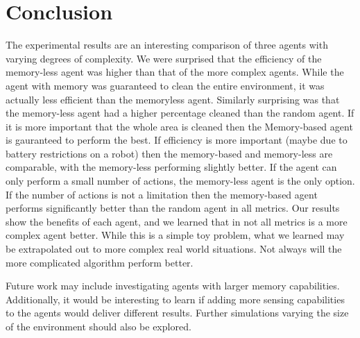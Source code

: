 \documentclass[a4paper,10pt]{article}
\begin{document}
\section{Conclusion}
The experimental results are an interesting comparison of three agents with varying degrees of complexity.
We were surprised that the efficiency of the memory-less agent was higher than that of the more complex agents.
While the agent with memory was guaranteed to clean the entire environment, it was actually less efficient than the memoryless agent.
Similarly surprising was that the memory-less agent had a higher percentage cleaned than the random agent.
If it is more important that the whole area is cleaned then the Memory-based agent is gauranteed to perform the best.
If efficiency is more important (maybe due to battery restrictions on a robot) then the memory-based and memory-less are comparable, with the memory-less performing slightly better.
If the agent can only perform a small number of actions, the memory-less agent is the only option.
If the number of actions is not a limitation then the memory-based agent performs significantly better than the random agent in all metrics.
Our results show the benefits of each agent, and we learned that in not all metrics is a more complex agent better.
While this is a simple toy problem, what we learned may be extrapolated out to more complex real world situations.
Not always will the more complicated algorithm perform better.

Future work may include investigating agents with larger memory capabilities.
Additionally, it would be interesting to learn if adding more sensing capabilities to the agents would deliver different results.
Further simulations varying the size of the environment should also be explored.

\end{document}
